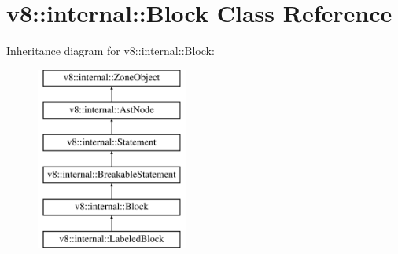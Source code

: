 \hypertarget{classv8_1_1internal_1_1Block}{}\section{v8\+:\+:internal\+:\+:Block Class Reference}
\label{classv8_1_1internal_1_1Block}
Inheritance diagram for v8\+:\+:internal\+:\+:Block\+:\begin{figure}[H]
\begin{center}
\leavevmode
\includegraphics[height=6.000000cm]{classv8_1_1internal_1_1Block}
\end{center}
\end{figure}
